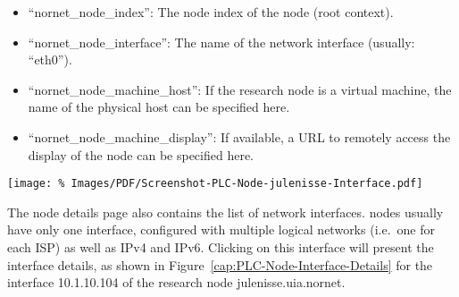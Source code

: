\begin{itemize}
 \item ``nornet\_node\_index'': The node index of the node (root context).
 
 \item ``nornet\_node\_interface'': The name of the  network interface (usually: ``eth0'').
 
 \item ``nornet\_node\_machine\_host'': If the research node is a virtual machine, the name of the physical host can be specified here.
 
 \item ``nornet\_node\_machine\_display'': If available, a URL to remotely access the display of the node can be specified here.

 \end{itemize}


\begin{figure*}
\begin{center}
\texttt{[image: \%
   Images/PDF/Screenshot-PLC-Node-julenisse-Interface.pdf]}
\end{center}
\caption{Nodes $\rightarrow$ Node julenisse.uia.nornet $\rightarrow$ Interface~10.1.7.100}
\label{cap:PLC-Node-Interface-Details}
\end{figure*}

The node details page also contains the list of network interfaces.  nodes usually have only one interface, configured with multiple logical networks (i.e.\ one for each ISP) as well as IPv4 and IPv6. Clicking on this interface will present the interface details, as shown in Figure~\ref{cap:PLC-Node-Interface-Details} for the interface 10.1.10.104 of the research node julenisse.uia.nornet.

